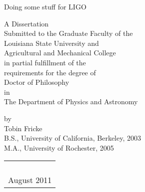 \thispagestyle{empty}
\begin{center}
Doing some stuff for LIGO
\vspace{1.75in}

A Dissertation\\
\vspace{1ex}
Submitted to the Graduate Faculty of the\\
Louisiana State University and\\
Agricultural and Mechanical College\\
in partial fulfillment of the\\
requirements for the degree of\\
Doctor of Philosophy\\
\vspace{1ex}
in\\
\vspace{1ex}
The Department of Physics and Astronomy\\

\vspace{1.75in}

by\\
Tobin Fricke \\
B.S., University of California, Berkeley, 2003\\
M.A., University of Rochester, 2005 \\

\begin{tabular}{c}
\\
\\
\\
\\
\\
August 2011
\end{tabular}

\end{center}

